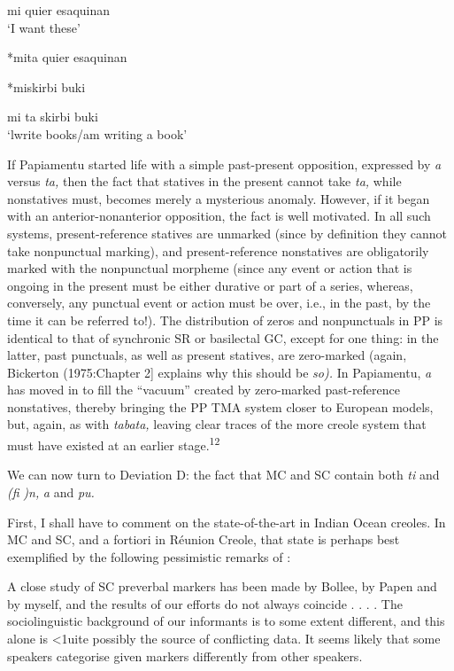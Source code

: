 \ea\label{ex:2:99}
 mi quier esaquinan \\
\glt `I want these'
\z

\ea\label{ex:2:160}
 *mita quier esaquinan
\z

\ea\label{ex:2:101}
 *miskirbi buki
\z

\ea\label{ex:2:102}
 mi ta skirbi buki \\
\glt `lwrite books/am writing a book'
\z



If Papiamentu started life with a simple past-present opposition,
expressed by \textit{a} versus \textit{ta,} then the fact that statives in the present cannot take \textit{ta,} while nonstatives must, becomes merely a mysterious anomaly. However, if it began with an anterior-nonanterior opposition, the fact is well motivated. In all such systems, present-reference statives are unmarked (since by definition they cannot take nonpunctual mark\-ing), and present-reference nonstatives are obligatorily marked with the nonpunctual morpheme (since any event or action that is ongoing in the present must be either durative or part of a series, whereas, con\-versely, any punctual event or action must be over, i.e., in the past, by the time it can be referred to!). The distribution of zeros and nonpunctuals in PP is identical to that of synchronic SR or basilectal GC, except for one thing: in the latter, past punctuals, as well as present statives, are zero-marked (again, Bickerton (1975:Chapter 2] explains why this should be \textit{so).} In Papiamentu, \textit{a} has moved in to fill the ``vacuum'' created by zero-marked past-reference nonstatives, thereby bringing the PP TMA system closer to European models, but, again, as with \textit{tabata,} leaving clear traces of the more creole system that must have existed at an earlier stage.\textsuperscript{12}

We can now turn to Deviation D: the fact that MC and SC contain both \textit{ti} and \textit{(}\textit{fi} \textit{)n,} \textit{a} and \textit{pu.}

First, I shall have to comment on the state-of-the-art in Indian Ocean creoles. In MC and SC, and a fortiori in Réunion Creole, that state is perhaps best exemplified by the following pessimistic remarks of \citet[94-95]{Corne1977}:

A close study of SC preverbal markers has been made by Bollee, by Papen and by myself, and the results of our efforts do not always coincide . . . . The sociolinguistic background of our informants is to some extent different, and this alone is {\textless}1uite possibly the source of conflicting data. It seems likely that some speakers categorise given markers differently from other speakers.

